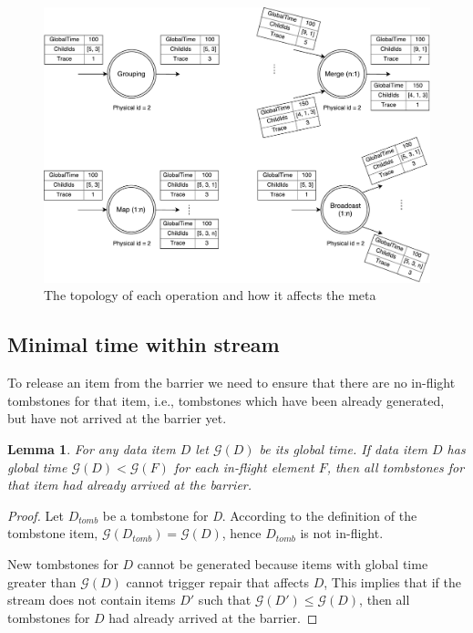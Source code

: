 \begin{figure}[ht]
  \centering
  \includegraphics[width=\linewidth]{pics/operations}
  \caption{The topology of each operation and how it affects the meta}
  \label {logical-graph-ops-figure}
\end{figure}

\label{mininal-time}

\subsection{Minimal time within stream}

To release an item from the barrier we need to ensure that there are no in-flight tombstones for that item, i.e., tombstones which have been already generated, but have not arrived at the barrier yet.

\newtheorem{minimal-time-claim}{Lemma}

\begin{minimal-time-claim}
For any data item $D$ let $\mathcal{G} (D)$ be its global time. 
  If data item $D$ has global time $\mathcal{G} (D) < \mathcal{G} (F)$ for each in-flight element $F$, 
  then all tombstones for that item had already arrived at the barrier.
\end{minimal-time-claim}

\begin{proof}
  Let $D_{tomb}$ be a tombstone for {\it D}. 
  According to the definition of the tombstone item, $\mathcal{G} (D_{tomb}) = \mathcal{G} (D)$, hence $D_{tomb}$ is not in-flight.
  
  New tombstones for $D$ cannot be generated because items with global time greater than $\mathcal{G} (D)$ cannot trigger repair that affects $D$,
  This implies that if the stream does not contain items $D\prime$ such that $\mathcal{G} (D\prime) \le \mathcal{G} (D)$, then all tombstones for $D$ had already arrived at the barrier. 
\end{proof}

